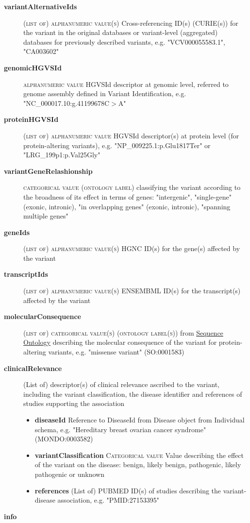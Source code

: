 \documentclass[a4paper, 10pt]{article}        %
\begin{document}
  \begin{description}
	\item[\textbf{variantAlternativeIds}] {\textsc{(list of) alphanumeric value(s)}} Cross-referencing ID(s) (CURIE(s)) for the variant in the original databases or variant-level (aggregated) databases for previously described variants, e.g. "VCV000055583.1", "CA003602"
	\item[\textbf{genomicHGVSId}]  {\textsc{alphanumeric value}} HGVSId descriptor at genomic level, referred to genome assembly defined in Variant Identification, e.g. "NC\_000017.10:g.41199678C$>$A"
	\item[\textbf{proteinHGVSId}] {\textsc{(list of) alphanumeric value}} HGVSId descriptor(s) at protein level (for protein-altering variants), e.g. "NP\_009225.1:p.Glu1817Ter" or "LRG\_199p1:p.Val25Gly"
	\item[\textbf{variantGeneRelashionship}] {\textsc{categorical value (ontology label)}} classifying the variant according to the broadness of its effect in terms of genes: "intergenic", "single-gene" (exonic, intronic), "in overlapping genes" (exonic, intronic), "spanning multiple genes"	
		
	\item[\textbf{geneIds}] {\textsc{(list of) alphanumeric value(s)}} HGNC ID(s) for the gene(s) affected by the variant
	\item[\textbf{transcriptIds}] {\textsc{(list of) alphanumeric value(s)}} ENSEMBML ID(s) for the transcript(s) affected by the variant
	\item[\textbf{molecularConsequence}] {\textsc{(list of) categorical value(s) (ontology label(s))}} from \href{http://www.sequenceontology.org}{Sequence Ontology} describing the molecular consequence of the variant for protein-altering variants, e.g. "missense variant" (SO:0001583)
	\item[\textbf{clinicalRelevance}] (List of) descriptor(s) of clinical relevance ascribed to the variant, including the variant classification, the disease identifier and references of studies supporting the association
	        \begin{itemize}
		\item[] \textbf{diseaseId} Reference to DiseaseId from Disease object from Individual schema, e.g. "Hereditary breast ovarian cancer syndrome" (MONDO:0003582)
		\item[] \textbf{variantClassification} {\textsc{Categorical value}} Value describing the effect of the variant on the disease: benign, likely benign, pathogenic, likely pathogenic or unknown
		\item[] \textbf{references} (List of) PUBMED ID(s) of studies describing the variant-disease association, e.g. "PMID:27153395"
                 \end{itemize}
	\item[\textbf{info}] 
 \end{description}
 
\end{document}
